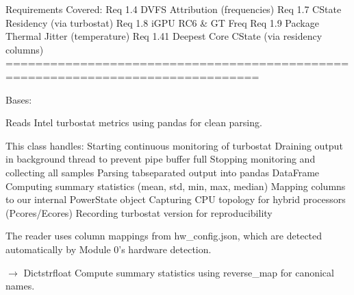 \documentclass[letterpaper,10pt,english]{sphinxmanual}
\begin{document}
\sphinxAtStartPar
Requirements Covered:
Req 1.4 \textendash{} DVFS Attribution (frequencies)
Req 1.7 \textendash{} C\sphinxhyphen{}State Residency (via turbostat)
Req 1.8 \textendash{} iGPU RC6 \& GT Freq
Req 1.9 \textendash{} Package Thermal Jitter (temperature)
Req 1.41 \textendash{} Deepest Core C\sphinxhyphen{}State (via residency columns)
================================================================================

\begin{fulllineitems}
\label{\detokenize{core.readers.turbostat_reader:core.readers.turbostat_reader.TurbostatReader}}
\pysigstartsignatures
\pysiglinewithargsret
{}
{}
{}
\pysigstopsignatures
\sphinxAtStartPar
Bases: 

\sphinxAtStartPar
Reads Intel turbostat metrics using pandas for clean parsing.

\sphinxAtStartPar
This class handles:
\sphinxhyphen{} Starting continuous monitoring of turbostat
\sphinxhyphen{} Draining output in background thread to prevent pipe buffer full
\sphinxhyphen{} Stopping monitoring and collecting all samples
\sphinxhyphen{} Parsing tab\sphinxhyphen{}separated output into pandas DataFrame
\sphinxhyphen{} Computing summary statistics (mean, std, min, max, median)
\sphinxhyphen{} Mapping columns to our internal PowerState object
\sphinxhyphen{} Capturing CPU topology for hybrid processors (P\sphinxhyphen{}cores/E\sphinxhyphen{}cores)
\sphinxhyphen{} Recording turbostat version for reproducibility

\sphinxAtStartPar
The reader uses column mappings from hw\_config.json, which are
detected automatically by Module 0’s hardware detection.

\begin{fulllineitems}
\label{\detokenize{core.readers.turbostat_reader:core.readers.turbostat_reader.TurbostatReader.compute_summary}}
\pysigstartsignatures
\pysiglinewithargsret
{}
{}
{{ $\rightarrow$ Dict\DUrole{p}{{[}}strfloat\DUrole{p}{{]}}}}
\pysigstopsignatures
\sphinxAtStartPar
Compute summary statistics using reverse\_map for canonical names.


\end{fulllineitems}
\end{fulllineitems}
\end{document}
